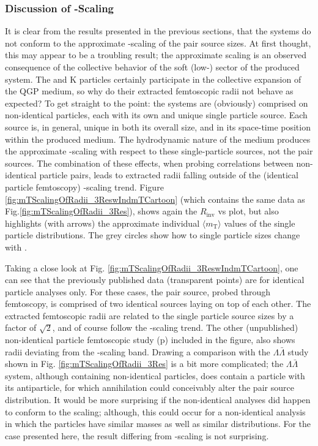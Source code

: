 \documentclass[/home/jesse/Analysis/FemtoAnalysis/AnalysisNotes/AnalysisNoteJBuxton.tex]{subfiles}
\begin{document}
\subsubsection{Discussion of \mt-Scaling}
\label{ResultsLamK_DiscussionOfmTScaling}

It is clear from the results presented in the previous sections, that the \LamK systems do not conform to the approximate \mt-scaling of the pair source sizes. 
At first thought, this may appear to be a troubling result; the approximate scaling is an observed consequence of the collective behavior of the soft (low-\pt) sector of the produced system.
The \Lam and K  particles certainly participate in the collective expansion of the QGP medium, so why do their extracted femtoscopic radii not behave as expected?
To get straight to the point: the \LamK systems are (obviously) comprised on non-identical particles, each with its own and unique single particle source.
Each source is, in general, unique in both its overall size, and in its space-time position within the produced medium.
The hydrodynamic nature of the medium produces the approximate \mt-scaling with respect to these single-particle sources, not the pair sources.
The combination of these effects, when probing correlations between non-identical particle pairs, leads to extracted radii falling outside of the (identical particle femtoscopy) \mt-scaling trend.
Figure \ref{fig:mTScalingOfRadii_3ReswIndmTCartoon} (which contains the same data as Fig.\ref{fig:mTScalingOfRadii_3Res}), shows again the $R_{\mathrm{inv}}$ vs \mt plot, but also highlights (with arrows) the approximate individual $\langle m_{\mathrm{T}} \rangle$ values of the single particle distributions.
The grey circles show how to single particle sizes change with \mt.

Taking a close look at Fig. \ref{fig:mTScalingOfRadii_3ReswIndmTCartoon}, one can see that the previously published data (transparent points) are for identical particle analyses only.
For these cases, the pair source, probed through femtoscopy, is comprised of two identical sources laying on top of each other.
The extracted femtoscopic radii are related to the single particle source sizes by a factor of $\sqrt{2}$, and of course follow the \mt-scaling trend.
The other (unpublished) non-identical particle femtoscopic study (p\Lam) included in the figure, also shows radii deviating from the \mt-scaling band.
Drawing a comparison with the $\Lambda\bar{\Lambda}$ study shown in Fig. \ref{fig:mTScalingOfRadii_3Res} is a bit more complicated; the $\Lambda\bar{\Lambda}$ system, although containing non-identical particles, does contain a particle with its antiparticle, for which annihilation could conceivably alter the pair source distribution.
It would be more surprising if the non-identical analyses did happen to conform to the scaling; although, this could occur for a non-identical analysis in which the particles have similar masses as well as similar \mt distributions.
For the case presented here, the result differing from \mt-scaling is not surprising. 
\end{document}

